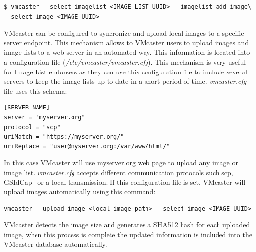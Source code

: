 \documentclass{llncs_Ibergrid2013}
\begin{document}
\begin{verbatim}
$ vmcaster --select-imagelist <IMAGE_LIST_UUID> --imagelist-add-image\ 
--select-image <IMAGE_UUID>
\end{verbatim}

VMcaster can be configured to syncronize and upload local images to a specific server endpoint. This mechanism allows to VMcaster users to upload images and image lists to a web server in an automated way.
This information is located into a configuration file (\textit{/etc/vmcaster/vmcaster.cfg}). This mechanism is very useful for Image List endorsers as they can use this configuration file to include several servers to keep the image lists up to date in a short period of time.
\textit{vmcaster.cfg} file uses this schema:
\begin{verbatim}
[SERVER NAME]
server = "myserver.org"
protocol = "scp"
uriMatch = "https://myserver.org/"
uriReplace = "user@myserver.org:/var/www/html/"
\end{verbatim}
In this case VMcaster will use \url{myserver.org} web page to upload any image or image list. 
\textit{vmcaster.cfg} accepts different communication protocols such scp, GSIdCap~\cite{dcache} or a local transmission. If this configuration file is set, VMcaster will upload images automatically using this command:

\begin{verbatim}
vmcaster --upload-image <local_image_path> --select-image <IMAGE_UUID>
\end{verbatim}

VMcaster detects the image size and generates a SHA512 hash for each uploaded image, when this process is complete the updated information is included into the VMcaster database automatically.
\end{document}
